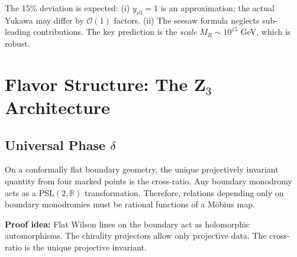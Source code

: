 \begin{remark}
The 15\% deviation is expected: (i) $y_{\nu 3} = 1$ is an approximation; the 
actual Yukawa may differ by $\mathcal{O}(1)$ factors. (ii) The seesaw formula 
neglects sub-leading contributions. The key prediction is the \emph{scale} 
$M_R \sim 10^{15}$ GeV, which is robust.
\end{remark}

\section{\texorpdfstring{Flavor Structure: The Z$_3$ Architecture}{Flavor Structure: The Z3 Architecture}}

\subsection{\texorpdfstring{Universal Phase $\delta$}{Universal Phase delta}}

\begin{tcolorbox}[colback=purple!3, colframe=purple!50!black, 
    title={\textbf{Lemma (Cross-Ratio from Boundary Monodromy)}}, fonttitle=\bfseries\small]
On a conformally flat boundary geometry, the unique projectively invariant quantity 
from four marked points is the cross-ratio. Any boundary monodromy acts as a 
PSL$(2,\mathbb{R})$ transformation. Therefore, relations depending only on boundary 
monodromies must be rational functions of a M\"obius map.

\textbf{Proof idea:} Flat Wilson lines on the boundary act as holomorphic automorphisms. 
The chirality projectors allow only projective data. The cross-ratio is the unique 
projective invariant.
\end{tcolorbox}

